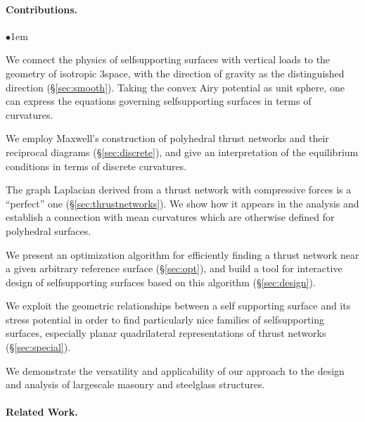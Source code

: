 \documentclass[review]{acmsiggraph}
\newcommand{\secref}[1]{(\S\ref{#1})}
\begin{document}
\paragraph{Contributions.} 

\begin{list}{$\bullet$}{\itemindent1em}

\item We connect the physics of self\dash supporting surfaces with 
vertical loads to the geometry of isotropic 3\dash space, with the 
direction of gravity as the distinguished direction \secref{sec:smooth}. 
Taking the convex Airy potential as unit sphere, one can express the 
equations governing self\dash supporting surfaces in terms of curvatures.


\item We employ Maxwell's construction of polyhedral thrust networks and 
their reciprocal diagrams \secref{sec:discrete}, and give an 
interpretation of the equilibrium conditions in terms of discrete 
curvatures.

\item The graph Laplacian derived from a thrust network with compressive 
forces is a ``perfect'' one \secref{sec:thrustnetworks}.
We show how it appears in the analysis and 
establish a connection with mean curvatures which are otherwise defined 
for polyhedral surfaces.


\item We present an optimization algorithm for efficiently finding a 
thrust network near a given arbitrary reference surface \secref{sec:opt}, 
and build a tool for interactive design of self\dash supporting surfaces 
based on this algorithm \secref{sec:design}.

\item We exploit the geometric relationships between a self\dash 
supporting surface and its stress potential in order to find particularly 
nice families of self\dash supporting surfaces, especially planar 
quadrilateral representations of thrust networks \secref{sec:special}.

\item We demonstrate the versatility and applicability of our approach to 
the design and analysis of large\dash scale masonry and steel\dash glass 
structures.

\end{list}


\paragraph{Related Work.}
\end{document}
